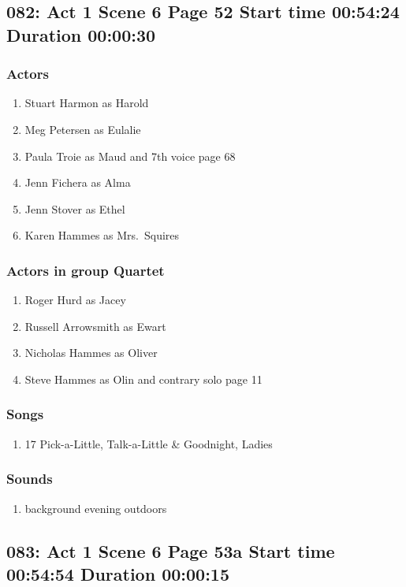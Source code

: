 \subsection{082: Act 1 Scene 6 Page 52 Start time 00:54:24 Duration 00:00:30}

\subsubsection{Actors}
\begin{enumerate}
\item Stuart Harmon as Harold
\item Meg Petersen as Eulalie
\item Paula Troie as Maud and 7th voice page 68
\item Jenn Fichera as Alma
\item Jenn Stover as Ethel
\item Karen Hammes as Mrs.~Squires
\end{enumerate}
\subsubsection{Actors in group Quartet}
\begin{enumerate}
\item Roger Hurd as Jacey
\item Russell Arrowsmith as Ewart
\item Nicholas Hammes as Oliver
\item Steve Hammes as Olin and contrary solo page 11
\end{enumerate}

\subsubsection{Songs}
\begin{enumerate}
\item 17 Pick-a-Little, Talk-a-Little \& Goodnight, Ladies
\end{enumerate}\subsubsection{Sounds}
\begin{enumerate}
\item background evening outdoors
\end{enumerate}
\subsection{083: Act 1 Scene 6 Page 53a Start time 00:54:54 Duration 00:00:15}

